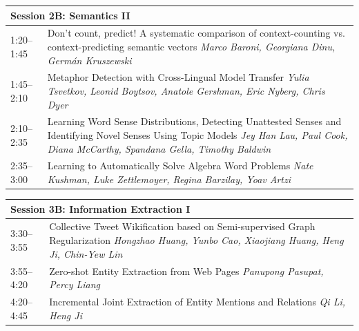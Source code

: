 \documentclass{book}
\renewcommand{\large}{\fontsize{36}{40}\selectfont}
\begin{document}
\begin{tabular}{p{3in}p{16in}}
  \multicolumn{2}{l}{\bfseries\large Session 2B: Semantics II} \\\hline

    
    1:20--1:45
    &	Don't count, predict! A systematic comparison of context-counting vs. context-predicting semantic vectors \newline 
    {\itshape Marco Baroni, Georgiana Dinu, Germán Kruszewski} \\
    
    1:45--2:10
    &	Metaphor Detection with Cross-Lingual Model Transfer \newline 
    {\itshape Yulia Tsvetkov, Leonid Boytsov, Anatole Gershman, Eric Nyberg, Chris Dyer} \\
    
    2:10--2:35
    &	Learning Word Sense Distributions, Detecting Unattested Senses and Identifying Novel Senses Using Topic Models \newline 
    {\itshape Jey Han Lau, Paul Cook, Diana McCarthy, Spandana Gella, Timothy Baldwin} \\
    
    2:35--3:00
    &	Learning to Automatically Solve Algebra Word Problems \newline 
    {\itshape Nate Kushman, Luke Zettlemoyer, Regina Barzilay, Yoav Artzi} \\
    
\end{tabular}

\begin{tabular}{p{3in}p{16in}}
  \multicolumn{2}{l}{\bfseries\large Session 3B: Information Extraction I} \\\hline

    
    3:30--3:55
    &	Collective Tweet Wikification based on Semi-supervised Graph Regularization \newline 
    {\itshape Hongzhao Huang, Yunbo Cao, Xiaojiang Huang, Heng Ji, Chin-Yew Lin} \\
    
    3:55--4:20
    &	Zero-shot Entity Extraction from Web Pages \newline 
    {\itshape Panupong Pasupat, Percy Liang} \\
    
    4:20--4:45
    &	Incremental Joint Extraction of Entity Mentions and Relations \newline 
    {\itshape Qi Li, Heng Ji} \\
    
\end{tabular}
\end{document}
